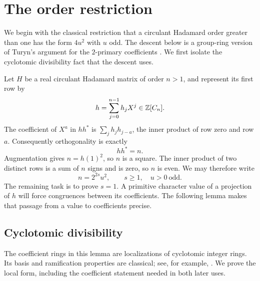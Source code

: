 \section{The order restriction}\label{sec:reduction}

We begin with the classical restriction that a circulant Hadamard order
greater than one has the form \(4u^2\) with \(u\) odd. The descent below
is a group-ring version of Turyn's argument for the \(2\)-primary
coefficients \cite[Lemma~6 through Theorem~8 and its Corollary,
pp.~334--336]{Turyn1965}. We first isolate the cyclotomic divisibility
fact that the descent uses.

Let \(H\) be a real circulant Hadamard matrix of order \(n>1\), and
represent its first row by
\[
 h=\sum_{j=0}^{n-1}h_jX^j\in\mathbb Z[C_n].
\]
The coefficient of \(X^a\) in \(hh^*\) is
\(\sum_j h_jh_{j-a}\), the inner product of row zero and row \(a\).
Consequently orthogonality is exactly
\begin{equation}\label{eq:hadamard-norm}
 hh^*=n.
\end{equation}
Augmentation gives \(n=h(1)^2\), so \(n\) is a square. The inner
product of two distinct rows is a sum of \(n\) signs and is zero,
so \(n\) is even. We may therefore write
\begin{equation}\label{eq:initial-order}
 n=2^{2s}u^2,\qquad s\geq1,\quad u>0\ \text{odd}.
\end{equation}
The remaining task is to prove \(s=1\). A primitive character value of
a projection of \(h\) will force congruences between its coefficients.
The following lemma makes that passage from a value to coefficients
precise.

\subsection{Cyclotomic divisibility}\label{sec:local}

The coefficient rings in this lemma are localizations of cyclotomic
integer rings. Its basis and ramification properties are classical;
see, for example, \cite[pp.~320--321]{Turyn1965}. We prove the local
form, including the coefficient statement needed in both later uses.

